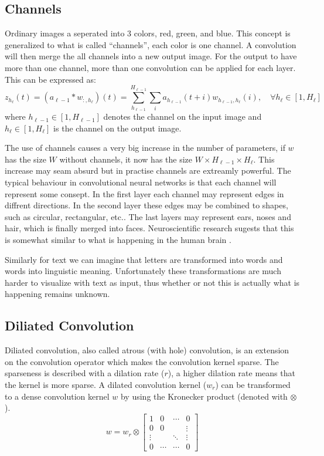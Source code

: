 \subsection{Channels}
Ordinary images a seperated into 3 colors, red, green, and blue. This concept is generalized to what is called ``channels'', each color is one channel. A convolution will then merge the all channels into a new output image. For the output to have more than one channel, more than one convolution can be applied for each layer. This can be expressed as:
\begin{equation}
z_{h_\ell}(t) = (a_{\ell-1} * w_{:, h_\ell})(t) = \sum_{h_{\ell-1}}^{H_{\ell-1}} \sum_{i} a_{h_{\ell-1}}(t + i) w_{h_{\ell-1}, h_\ell}(i), \quad \forall h_\ell \in [1, H_\ell]
\end{equation}
where $h_{\ell-1} \in [1, H_{\ell-1}]$ denotes the channel on the input image and $h_\ell \in [1, H_\ell]$ is the channel on the output image.

The use of channels causes a very big increase in the number of parameters, if $w$ has the size $W$ without channels, it now has the size $W \times H_{\ell-1} \times H_\ell$. This increase may seam absurd but in practise channels are extreamly powerful. The typical behaviour in convolutional neural networks is that each channel will represent some consept. In the first layer each channel may represent edges in diffrent directions. In the second layer these edges may be combined to shapes, such as circular, rectangular, etc.. The last layers may represent ears, noses and hair, which is finally merged into faces. Neuroscientific research sugests that this is somewhat similar to what is happening in the human brain \cite[chapter 9.10]{deep-learning}.

Similarly for text we can imagine that letters are transformed into words and words into linguistic meaning. Unfortunately these transformations are much harder to visualize with text as input, thus whether or not this is actually what is happening remains unknown.

\subsection{Diliated Convolution}

Diliated convolution, also called atrous (with hole) convolution, is an extension on the convolution operator which makes the convolution kernel sparse. The sparseness is described with a dilation rate ($r$), a higher dilation rate means that the kernel is more sparse. A dilated convolution kernel ($w_r$) can be transformed to a dense convolution kernel $w$ by using the Kronecker product (denoted with $\otimes$).
\begin{equation}
w = w_r \otimes \begin{bmatrix}
1      & 0      & \cdots & 0      \\
0      & 0      &        & \vdots \\
\vdots &        & \ddots & \vdots \\
0      & \cdots & \cdots & 0
\end{bmatrix}
\end{equation}

